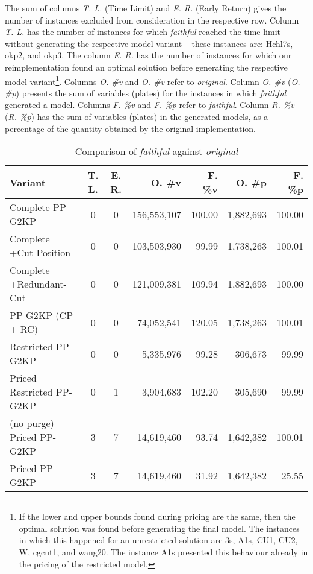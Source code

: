 \documentclass[ppgc,prop-tese,english,formais,babel]{iiufrgs}
\begin{document}
The sum of columns \emph{T. L.} (Time Limit) and \emph{E. R.} (Early Return) gives the number of instances excluded from consideration in the respective row.
Column \emph{T. L.} has the number of instances for which \emph{faithful} reached the time limit without generating the respective model variant -- these instances are: Hchl7s, okp2, and okp3.
The column \emph{E. R.} has the number of instances for which our reimplementation found an optimal solution before generating the respective model variant\footnote{
	If the lower and upper bounds found during pricing are the same, then the optimal solution was found before generating the final model.
	The instances in which this happened for an unrestricted solution are 3s, A1s, CU1, CU2, W, cgcut1, and wang20.
	The instance A1s presented this behaviour already in the pricing of the restricted model.
}.
Columns \emph{O. \#v} and \emph{O. \#v} refer to \emph{original}.
Column \emph{O. \#v} (\emph{O. \#p}) presents the sum of variables (plates) for the instances in which \emph{faithful} generated a model.
Columns \emph{F. \%v} and \emph{F. \%p} refer to \emph{faithful}.
Column \emph{R. \%v} (\emph{R. \%p}) has the sum of variables (plates) in the generated models, as a percentage of the quantity obtained by the original implementation.

\begin{table}
\centering
\caption{Comparison of \emph{faithful} against \emph{original}}
\begin{tabular}{lccrrrr}
\hline\hline
Variant & T. L. & E. R. & O. \#v & F. \%v & O. \#p & F. \%p\\\hline
Complete PP-G2KP & 0 & 0 & 156,553,107 & 100.00 & 1,882,693 & 100.00\\
Complete +Cut-Position & 0 & 0 & 103,503,930 & 99.99 & 1,738,263 & 100.01\\
Complete +Redundant-Cut & 0 & 0 & 121,009,381 & 109.94 & 1,882,693 & 100.00\\
PP-G2KP (CP + RC) & 0 & 0 & 74,052,541 & 120.05 & 1,738,263 & 100.01\\
Restricted PP-G2KP & 0 & 0 & 5,335,976 & 99.28 & 306,673 & 99.99\\
Priced Restricted PP-G2KP & 0 & 1 & 3,904,683 & 102.20 & 305,690 & 99.99\\
(no purge) Priced PP-G2KP & 3 & 7 & 14,619,460 & 93.74 & 1,642,382 & 100.01\\
Priced PP-G2KP & 3 & 7 & 14,619,460 & 31.92 & 1,642,382 & 25.55\\\hline\hline
\end{tabular}
\label{tab:faithful_reimplementation}
\end{table}
\end{document}
